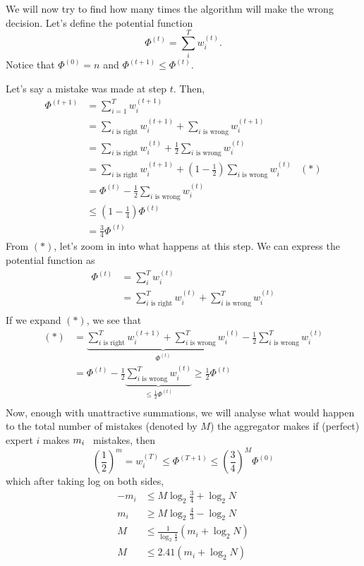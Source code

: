 \documentclass[12pt]{article}
\begin{document}
We will now try to find how many times the algorithm will make the wrong decision. Let's define the potential function 
$$\Phi^{(t)} = \sum_{i}^{T}w_i^{(t)}.$$
Notice that $\Phi^{(0)}=n$ and $\Phi^{(t+1)} \leq \Phi^{(t)}.$

Let's say a mistake was made at step $t$. Then,
\begin{align*}
\Phi^{(t+1)} & = \sum_{i=1}^{T}w_i^{(t+1)} \\
&= \sum_{i\text{ is right}}w_i^{(t+1)} +\sum_{i\text{ is wrong}}w_i^{(t+1)}\\
&= \sum_{i\text{ is right}}w_i^{(t)} + \frac{1}{2}\sum_{i\text{ is wrong}}w_i^{(t)} \\
&= \sum_{i\text{ is right}}w_i^{(t+1)}  +(1- \frac{1}{2})\sum_{i\text{ is wrong}} w_i^{(t)} &(*) \\
&= \Phi^{(t)}  -  \frac{1}{2}\sum_{i\text{ is wrong}}w_i^{(t)} \\
&\leq(1-\frac{1}{4}) \Phi^{(t)} \\
&= \frac{3}{4} \Phi^{(t)}
\end{align*}
From $(*)$, let's zoom in into what happens at this step. We can express the potential function as
\begin{align*}
\Phi^{(t)} &= \sum_{i}^{T}w_i^{(t)} \\
&=\sum_{i\text{ is right}}^{T}w_i^{(t)} +\sum_{i\text{ is wrong}}^{T}w_i^{(t)}\\
\end{align*}
If we expand $(*)$, we see that
\begin{align*}
(*) & = \underbrace{ \sum_{i\text{ is right}}^{T}w_i^{(t+1)}  + \sum_{i\text{ is wrong}}^{T}w_i^{(t)} }_{\Phi^{(t)}}  - \frac{1}{2} \sum_{i\text{ is wrong}}^{T}w_i^{(t)}\\
&= \Phi^{(t)} - \frac{1}{2} \underbrace{\sum_{i\text{ is wrong}}^{T}w_i^{(t)}}_{\leq \frac{1}{2}\Phi^{(t)}} \geq \frac{1}{2}\Phi^{(t)}\\
\end{align*}
Now, enough with unattractive summations, we will analyse what would happen to the total number of mistakes (denoted by $M$) the aggregator makes  if (perfect) expert $i$ makes $ \textbf{\textit{$m_i$ }} $ mistakes, then
$$  \left ( \frac{1}{2} \right) ^m = w_i^{(T)}  \leq  \Phi^{(T+1)} \leq \left (\frac{3}{4} \right )^M \Phi^{(0)}$$
which after taking log on both sides,
\begin{align*}
-m_i &\leq M\log_2\frac{3}{4} + \log_2N\\
m_i &\geq M\log_2\frac{4}{3} - \log_2N\\
M &\leq \frac{1}{\log_2\frac{4}{3}} (m_i +  \log_2N)\\
M & \leq 2.41 (m_i +  \log_2N)
\end{align*}
\end{document}
